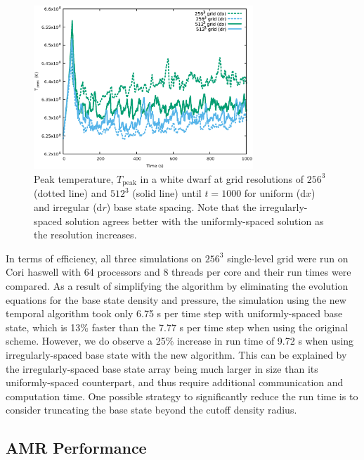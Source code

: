 \documentclass{aastex62}
\begin{document}
\begin{figure}[hbt]
\begin{center}
\includegraphics[width=3.25in]{wdconvect_compare_Tmax.eps}
\caption{\label{fig:wdconvect_Tmax} Peak temperature, $T_{\text{peak}}$  in a white dwarf at grid resolutions of
         $256^3$ (dotted line) and $512^3$ (solid line) until $t=1000$ for uniform (d$x$) and irregular (d$r$) base state spacing.
         Note that the irregularly-spaced solution agrees better
         with the uniformly-spaced solution as the resolution increases.}
\end{center}
\end{figure}

In terms of efficiency, all three simulations on $256^3$ single-level grid were run on Cori haswell with 64 processors and 8 threads per core and their run times were compared. As a result of simplifying the algorithm by eliminating the evolution equations for the base state density and pressure, the simulation using the new temporal algorithm took only 6.75 s per time step with uniformly-spaced base state, which is 13\% faster than the 7.77 s per time step when using the original scheme. However, we do observe a 25\% increase in run time of 9.72 s when using irregularly-spaced base state with the new algorithm. This can be explained by the irregularly-spaced base state array being much larger in size than its uniformly-spaced counterpart, and thus require additional communication and computation time. One possible strategy to significantly reduce the run time is to consider truncating the base state beyond the cutoff density radius.


\subsection{AMR Performance}
\end{document}
